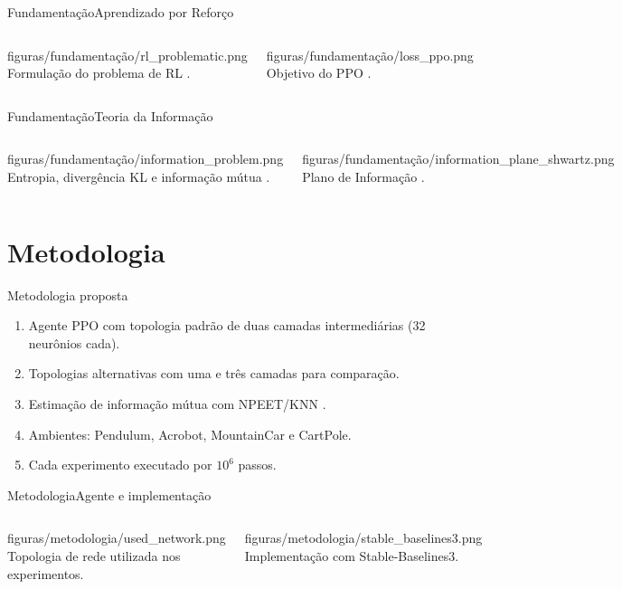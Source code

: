 \documentclass[
11pt,notheorems,hyperref={pdfauthor=Autor}
]{beamer}
\begin{document}
\begin{frame}{Fundamentação}{Aprendizado por Reforço}
\begin{columns}[T,onlytextwidth]
    \FigureWithFallbackCaption
    {figuras/fundamentação/rl_problematic.png}
    {Formulação do problema de RL \parencite{sutton1998reinforcement}.}

    \FigureWithFallbackCaption
    {figuras/fundamentação/loss_ppo.png}
    {Objetivo do PPO \parencite{schulman2017proximal}.}
\end{columns}
\end{frame}

\begin{frame}{Fundamentação}{Teoria da Informação}
\begin{columns}[T,onlytextwidth]
    \FigureWithFallbackCaption
    {figuras/fundamentação/information_problem.png}
    {Entropia, divergência KL e informação mútua \parencite{cover2006elements}.}

    \FigureWithFallbackCaption
    {figuras/fundamentação/information_plane_shwartz.png}
    {Plano de Informação \parencite{shwartz2017opening}.}
\end{columns}
\end{frame}

\section{Metodologia}
\begin{frame}{Metodologia proposta}
\begin{enumerate}
    \item Agente PPO com topologia padrão de duas camadas intermediárias (32 neurônios cada).
    \item Topologias alternativas com uma e três camadas para comparação.
    \item Estimação de informação mútua com NPEET/KNN \parencite{kraskov2004estimating}.
    \item Ambientes: Pendulum, Acrobot, MountainCar e CartPole.
    \item Cada experimento executado por $10^6$ passos.
\end{enumerate}
\end{frame}

\begin{frame}{Metodologia}{Agente e implementação}
\begin{columns}[T,onlytextwidth]
    \FigureWithFallbackCaption
    {figuras/metodologia/used_network.png}
    {Topologia de rede utilizada nos experimentos.}

    \FigureWithFallbackCaption
    {figuras/metodologia/stable_baselines3.png}
    {Implementação com Stable-Baselines3.}
\end{columns}
\end{frame}
\end{document}
